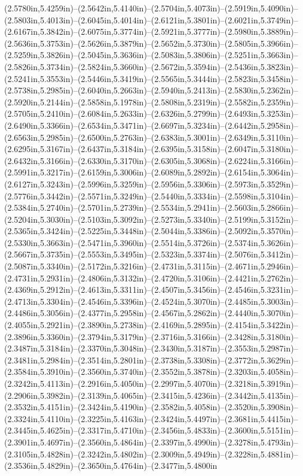 (2.5780in,5.4259in)--(2.5642in,5.4140in)--(2.5704in,5.4073in)--(2.5919in,5.4090in)--(2.5803in,5.4013in)--(2.6045in,5.4014in)--(2.6121in,5.3801in)--(2.6021in,5.3749in)--(2.6167in,5.3842in)--(2.6075in,5.3774in)--(2.5921in,5.3777in)--(2.5980in,5.3889in)--(2.5636in,5.3753in)--(2.5626in,5.3879in)--(2.5652in,5.3730in)--(2.5805in,5.3966in)--(2.5259in,5.3826in)--(2.5045in,5.3636in)--(2.5083in,5.3806in)--(2.5251in,5.3663in)--(2.5826in,5.3734in)--(2.5824in,5.3660in)--(2.5672in,5.3594in)--(2.5436in,5.3823in)--(2.5241in,5.3553in)--(2.5446in,5.3419in)--(2.5565in,5.3444in)--(2.5823in,5.3458in)--(2.5738in,5.2985in)--(2.6040in,5.2663in)--(2.5940in,5.2413in)--(2.5830in,5.2362in)--(2.5920in,5.2144in)--(2.5858in,5.1978in)--(2.5808in,5.2319in)--(2.5582in,5.2359in)--(2.5705in,5.2410in)--(2.6084in,5.2633in)--(2.6326in,5.2799in)--(2.6493in,5.3253in)--(2.6490in,5.3366in)--(2.6534in,5.3471in)--(2.6697in,5.3234in)--(2.6442in,5.2958in)--(2.6563in,5.2985in)--(2.6500in,5.2763in)--(2.6383in,5.3001in)--(2.6349in,5.3110in)--(2.6295in,5.3167in)--(2.6437in,5.3184in)--(2.6395in,5.3158in)--(2.6047in,5.3180in)--(2.6432in,5.3166in)--(2.6330in,5.3170in)--(2.6305in,5.3068in)--(2.6224in,5.3166in)--(2.5991in,5.3217in)--(2.6159in,5.3006in)--(2.6089in,5.2892in)--(2.6154in,5.3064in)--(2.6127in,5.3243in)--(2.5996in,5.3259in)--(2.5956in,5.3306in)--(2.5973in,5.3529in)--(2.5776in,5.3442in)--(2.5571in,5.3249in)--(2.5440in,5.3334in)--(2.5598in,5.3104in)--(2.5384in,5.2740in)--(2.5701in,5.2739in)--(2.5534in,5.2941in)--(2.5603in,5.2866in)--(2.5204in,5.3030in)--(2.5103in,5.3092in)--(2.5273in,5.3340in)--(2.5199in,5.3152in)--(2.5365in,5.3424in)--(2.5225in,5.3448in)--(2.5044in,5.3386in)--(2.5092in,5.3570in)--(2.5330in,5.3663in)--(2.5471in,5.3960in)--(2.5514in,5.3726in)--(2.5374in,5.3626in)--(2.5667in,5.3735in)--(2.5553in,5.3495in)--(2.5323in,5.3374in)--(2.5076in,5.3412in)--(2.5087in,5.3340in)--(2.5172in,5.3216in)--(2.4731in,5.3115in)--(2.4671in,5.2946in)--(2.4731in,5.2931in)--(2.4806in,5.3132in)--(2.4720in,5.3106in)--(2.4421in,5.2762in)--(2.4369in,5.2912in)--(2.4613in,5.3311in)--(2.4507in,5.3456in)--(2.4546in,5.3231in)--(2.4713in,5.3304in)--(2.4546in,5.3396in)--(2.4524in,5.3070in)--(2.4485in,5.3003in)--(2.4486in,5.3056in)--(2.4377in,5.2958in)--(2.4567in,5.2862in)--(2.4440in,5.3070in)--(2.4055in,5.2921in)--(2.3890in,5.2738in)--(2.4169in,5.2895in)--(2.4154in,5.3422in)--(2.3896in,5.3360in)--(2.3794in,5.3179in)--(2.3716in,5.3166in)--(2.3428in,5.3180in)--(2.3487in,5.3184in)--(2.3370in,5.3048in)--(2.3430in,5.3187in)--(2.3553in,5.2987in)--(2.3481in,5.2984in)--(2.3514in,5.2801in)--(2.3738in,5.3308in)--(2.3772in,5.3629in)--(2.3584in,5.3910in)--(2.3560in,5.3740in)--(2.3552in,5.3878in)--(2.3203in,5.4058in)--(2.3242in,5.4113in)--(2.2916in,5.4050in)--(2.2997in,5.4070in)--(2.3218in,5.3919in)--(2.2906in,5.3982in)--(2.3139in,5.4065in)--(2.3415in,5.4236in)--(2.3442in,5.4135in)--(2.3532in,5.4151in)--(2.3424in,5.4190in)--(2.3582in,5.4058in)--(2.3520in,5.3908in)--(2.3324in,5.4110in)--(2.3225in,5.4163in)--(2.3424in,5.4497in)--(2.3681in,5.4415in)--(2.3445in,5.4625in)--(2.3317in,5.4710in)--(2.3456in,5.4833in)--(2.3600in,5.5151in)--(2.3901in,5.4697in)--(2.3560in,5.4864in)--(2.3397in,5.4990in)--(2.3278in,5.4793in)--(2.3105in,5.4828in)--(2.3242in,5.4802in)--(2.3009in,5.4949in)--(2.3228in,5.4881in)--(2.3536in,5.4829in)--(2.3650in,5.4764in)--(2.3477in,5.4800in
